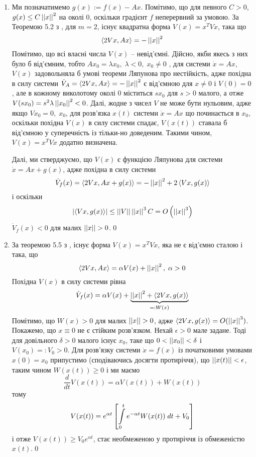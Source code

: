 \documentclass[12pt]{article} %
\begin{document}
	\begin{enumerate}
		\item Ми позначатимемо $g(x):=f(x)-Ax$. Помітимо, що для певного $C>0$, $g(x)\leq C\left|\left|x\right|\right|^2$ на околі $0$,
			оскільки градієнт $f$ неперервний за умовою. За Теоремою 5.2 з \cite{perestyuk}, для $m=2$, існує
			квадратна форма $V(x)=x^TVx$, така що \[\left<2Vx,Ax\right>=-\left|\left|x\right|\right|^2\] Помітимо, що всі власні
			числа $V(x)$ -- невід’ємні. Дійсно, якби якесь з них було б від’ємним, тобто $Ax_0=\lambda x_0,\;\lambda<0,\;
			x_0\neq0$
			, для системи $\dot{x}=Ax$, 
			$V(x)$ задовольняла б умові теореми Ляпунова про нестійкість, адже похідна в силу системи $\dot{V}_{A}
			=\left<2Vx,Ax\right>=-\left|\left|x\right|\right|^2$ є від’ємною для $x\neq0$ і $V(0)=0$, але в кожному виколотому околі $0$ міститься
			$sx_0$ для $s>0$ малого, а отже $V(sx_0)=s^2\lambda\left|\left|x_0\right|\right|^2<0$. Далі, жодне з чисел $V$ не може бути нульовим,
			адже якщо $Vx_0=0,\;x_0$, для розв’язка $x(t)$ системи $\dot{x}=Ax$ що починається в $x_0$, оскільки похідна $V(x)$ в силу
			системи спадає, $V(x(t))$ ставала б від’ємною у суперечність із тільки-но доведеним. Такими чином, $V(x)=x^TVx$ додатно
			визначена.

			Далі, ми стверджуємо, що $V(x)$ є функцією Ляпунова для системи $\dot{x}=Ax+g(x)$, адже похідна в силу системи
			\[\dot{V}_f(x)=\left<2Vx,Ax+g(x)\right>=-\left|\left|x\right|\right|^2+2\left<Vx,g(x)\right>\]
			і оскільки \[\left|\left<Vx,g(x)\right>\right|\leq\left|\left|V\right|\right|\left|\left|x\right|\right|^3C=O\left(\left|\left|x\right|\right|^3\right)\]
			$\dot{V}_f(x)<0$ для малих $\mynorm{x}>0$.\qed
		\item За теоремою 5.5 з \cite{perestyuk}, існує форма $V(x)=x^TVx$, яка не є від’ємно сталою і така, що
			\[\left<2Vx,Ax\right>=\alpha V(x)+\left|\left|x\right|\right|^2,\;\alpha>0\]
			Похідна $V(x)$ в силу системи рівна
			\[\dot{V}_f(x)=\alpha V(x)+\underbrace{\left|\left|x\right|\right|^2+\left<2Vx,g(x)\right>}_{=:W(x)}\]
			Помітимо, що $W(x)>0$ для малих $\mynorm{x}>0$, адже $\left<2Vx,g(x)\right>=O(\left|\left|x\right|\right|^3)$.
			Покажемо, що $x\equiv0$ не є стійким розв’язком. Нехай $\epsilon>0$ мале задане. Тоді для довільного $\delta>0$ малого
			існує $x_0$, таке що $0<\left|\left|x_0\right|\right|<\delta$ і $V(x_0)=:V_0>0$. Для розв’язку системи $\dot{x}=f(x)$ із
			початковими умовами $x(0)=x_0$ припустимо (сподіваючись досягти протиріччя), що $\left|\left|x(t)\right|\right|<\epsilon$, таким чином
			$W(x(t))\geq0$ і ми маємо
			\[\frac{d}{dt}V(x(t))=\alpha V(x(t))+W(x(t))\]
			тому
			\[V(x(t))=e^{\alpha t}\mysbra{\int_0^te^{-\alpha t}W(x(t))\;dt+V_0}\]
			і отже $V(x(t))\geq V_0e^{\alpha t}$, стає необмеженою у протиріччя із обмеженістю $x(t)$.\qed
	\end{enumerate}
\end{document}
